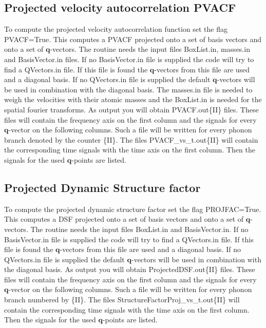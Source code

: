 \documentclass[a4paper,12pt]{article}
\begin{document}
\subsection{Projected velocity autocorrelation PVACF}
To compute the projected velocity autocorrelation function
set the flag\\ PVACF=True. This computes a PVACF projected onto
a set of basis vectors and onto a set of $\mathbf{q}$-vectors.
The routine needs the input files BoxList.in, masses.in and
BasisVector.in files. If no BasisVector.in file is supplied
the code will try to find a QVectors.in file. If this file
is found the $\mathbf{q}$-vectors from this file are used
and a diagonal basis. If no QVectors.in file
is supplied the default $\mathbf{q}$-vectors will be used
in combination with the diagonal basis.
The masses.in file is needed to weigh the velocities with their
atomic masses and the BoxList.in is needed for the spatial
fourier transforms.
As output you will obtain PVACF.out\{II\} files. These 
files will contain the frequency axis on the first column and
the signals for every $\mathbf{q}$-vector on the following columns.
Such a file will be written for every phonon branch denoted by the counter
\{II\}. The files PVACF\_vs\_t.out\{II\} will contain the corresponding
time signals with the time axis on the first column. Then the signals
for the used $\mathbf{q}$-points are listed.




\subsection{Projected Dynamic Structure factor}
To compute the projected dynamic structure factor
set the flag PROJFAC=True. This computes a DSF projected onto
a set of basis vectors and onto a set of $\mathbf{q}$-vectors.
The routine needs the input files BoxList.in and
BasisVector.in. If no BasisVector.in file is supplied
the code will try to find a QVectors.in file. If this file
is found the $\mathbf{q}$-vectors from this file are used
and a diagonal basis. If no QVectors.in file
is supplied the default $\mathbf{q}$-vectors will be used
in combination with the diagonal basis.
As output you will obtain ProjectedDSF.out\{II\} files. These 
files will contain the frequency axis on the first column and
the signals for every $\mathbf{q}$-vector on the following columns.
Such a file will be written for every phonon branch numbered by \{II\}.
The files StructureFactorProj\_vs\_t.out\{II\} will contain the corresponding
time signals with the time axis on the first column. Then the signals
for the used $\mathbf{q}$-points are listed.
\end{document}
